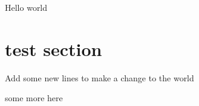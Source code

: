 \documentclass{article}
\begin{document}
	Hello world
	
	\section{test section}
	
	Add some new lines to make a change to the world
	
	some more here
\end{document}
